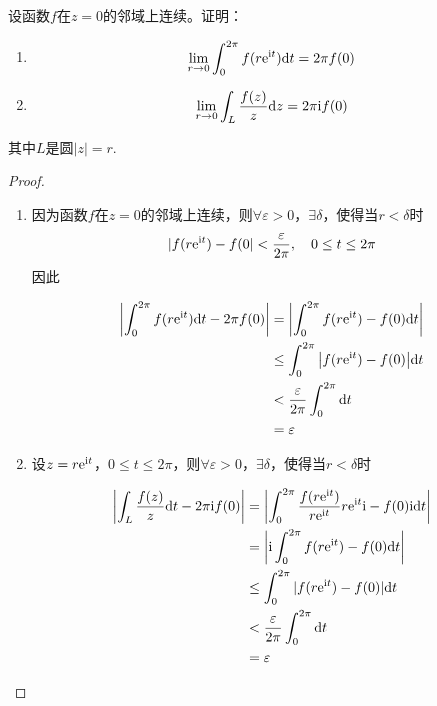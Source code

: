 \begin{proposition}

    设函数$f$在$z = 0$的邻域上连续。证明：

    \begin{enumerate}

        \item $$\lim\limits_{r \to 0}{\int_{0}^{2 \pi}{f(r\mathrm{e}^{\mathrm{i} t})}\mathrm{d} t} = 2 \pi f(0)$$
        
        \item $$ \lim\limits_{r \to 0}{\int_{L}{\dfrac{f(z)}{z}}\mathrm{d} z} = 2 \pi \mathrm{i} f(0)$$
        
    \end{enumerate}

    其中$L$是圆$|z| = r$.

\end{proposition}

\begin{proof}

    \begin{enumerate}

        \item 
            因为函数$f$在$z = 0$的邻域上连续，则$\forall \varepsilon > 0$，$\exists \delta$，使得当$r < \delta$时
            $$|f(r\mathrm{e}^{\mathrm{i} t}) - f(0| < \dfrac{\varepsilon}{2 \pi}, \quad 0 \leq t \leq 2 \pi$$
            因此

            \begin{align*}
                \left| \int_{0}^{2 \pi}{f(r\mathrm{e}^{\mathrm{i} t})}\mathrm{d} t - 2 \pi f(0) \right| & = \left| \int_{0}^{2 \pi}{f(r\mathrm{e}^{\mathrm{i} t}) - f(0)}\mathrm{d} t \right| \\
                & \leq \int_{0}^{2 \pi}{\left| f(r\mathrm{e}^{\mathrm{i} t}) - f(0) \right|}\mathrm{d} t \\
                & < \dfrac{\varepsilon}{2 \pi}\int_{0}^{2 \pi}\mathrm{d} t \\
                & = \varepsilon
            \end{align*}

        \item 
            设$z = r\mathrm{e}^{\mathrm{i} t}$，$0 \leq t \leq 2 \pi$，则$\forall \varepsilon > 0$，$\exists \delta$，使得当$r < \delta$时

            \begin{align*}
                \left| \int_{L}{\dfrac{f(z)}{z}}\mathrm{d} t - 2 \pi \mathrm{i} f(0) \right| & = \left| \int_{0}^{2 \pi}{\dfrac{f(r\mathrm{e}^{\mathrm{i} t})}{r\mathrm{e}^{\mathrm{i} t}}r\mathrm{e}^{\mathrm{i} t} \mathrm{i} - f(0)\mathrm{i}}\mathrm{d} t \right| \\
                & = \left| \mathrm{i} \int_{0}^{2 \pi}{f(r\mathrm{e}^{\mathrm{i} t}) - f(0)}\mathrm{d} t \right| \\
                & \leq \int_{0}^{2 \pi}{|f(r\mathrm{e}^{\mathrm{i} t}) - f(0)|}\mathrm{d} t \\
                & < \dfrac{\varepsilon}{2 \pi}\int_{0}^{2 \pi}\mathrm{d} t \\
                & = \varepsilon
            \end{align*}

    \end{enumerate}

\end{proof}

